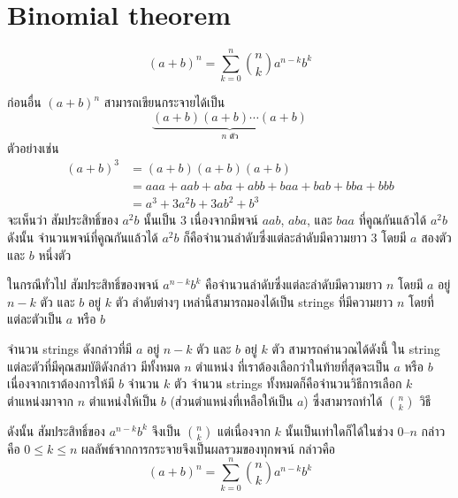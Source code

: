 \section{Binomial theorem}
\begin{theorem}
\[(a+b)^n=\sum_{k=0}^{n}{\binom{n}{k}a^{n-k}b^k}\]
\begin{pf}
ก่อนอื่น $(a+b)^n$ สามารถเขียนกระจายได้เป็น \[\underbrace{(a+b)(a+b)\cdots(a+b)}_{\text{$n$ ตัว}}\]
ตัวอย่างเช่น 
\begin{align*}
(a+b)^3
&=(a+b)(a+b)(a+b) \\
&=aaa+aab+aba+abb+baa+bab+bba+bbb \\
&=a^3+3a^2b+3ab^2+b^3
\end{align*}
จะเห็นว่า สัมประสิทธิ์ของ $a^2b$ นั้นเป็น 3 เนื่องจากมีพจน์ $aab$, $aba$, และ $baa$ ที่คูณกันแล้วได้ $a^2b$ \enskip ดังนั้น จำนวนพจน์ที่คูณกันแล้วได้ $a^2b$ ก็คือจำนวนลำดับซึ่งแต่ละลำดับมีความยาว 3 โดยมี $a$ สองตัวและ $b$ หนึ่งตัว

ในกรณีทั่วไป สัมประสิทธิ์ของพจน์ $a^{n-k}b^k$ คือจำนวนลำดับซึ่งแต่ละลำดับมีความยาว $n$ โดยมี $a$ อยู่ $n-k$ ตัว และ $b$ อยู่ $k$ ตัว \enskip ลำดับต่างๆ เหล่านี้สามารถมองได้เป็น strings ที่มีความยาว $n$ โดยที่แต่ละตัวเป็น $a$ หรือ $b$

จำนวน strings ดังกล่าวที่มี $a$ อยู่ $n-k$ ตัว และ $b$ อยู่ $k$ ตัว สามารถคำนวณได้ดังนี้ \enskip ใน string แต่ละตัวที่มีคุณสมบัติดังกล่าว มีทั้งหมด $n$ ตำแหน่ง ที่เราต้องเลือกว่าในท้ายที่สุดจะเป็น $a$ หรือ $b$ \enskip เนื่องจากเราต้องการให้มี $b$ จำนวน $k$ ตัว จำนวน strings ทั้งหมดก็คือจำนวนวิธีการเลือก $k$ ตำแหน่งมาจาก $n$ ตำแหน่งให้เป็น $b$ (ส่วนตำแหน่งที่เหลือให้เป็น $a$) ซึ่งสามารถทำได้ $\binom{n}{k}$ วิธี

ดังนั้น สัมประสิทธิ์ของ $a^{n-k}b^k$ จึงเป็น $\binom{n}{k}$ แต่เนื่องจาก $k$ นั้นเป็นเท่าใดก็ได้ในช่วง 0--$n$ กล่าวคือ $0\leq k\leq n$ ผลลัพธ์จากการกระจายจึงเป็นผลรวมของทุกพจน์ กล่าวคือ
\[(a+b)^n=\sum_{k=0}^{n}{\binom{n}{k}a^{n-k}b^k}\]
\end{pf}
\end{theorem}


